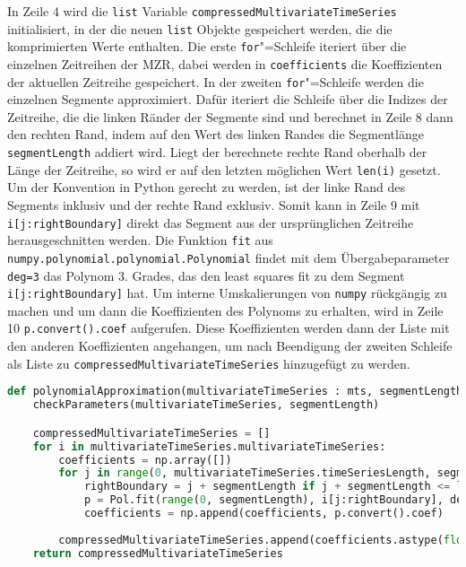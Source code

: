 In Zeile 4 wird die \lstinline|list| Variable \lstinline|compressedMultivariateTimeSeries| initialisiert, in der die neuen \lstinline|list| Objekte gespeichert werden, die die komprimierten Werte enthalten. Die erste \lstinline|for|"=Schleife iteriert über die einzelnen Zeitreihen der \ac{MZR}, dabei werden in \texttt{coeffi\allowbreak cients} die Koeffizienten der aktuellen Zeitreihe gespeichert. In der zweiten \lstinline|for|"=Schleife werden die einzelnen Segmente approximiert. Dafür iteriert die Schleife über die Indizes der Zeitreihe, die die linken Ränder der Segmente sind und berechnet in Zeile 8 dann den rechten Rand, indem auf den Wert des linken Randes die Segmentlänge \lstinline|segmentLength| addiert wird. Liegt der berechnete rechte Rand oberhalb der Länge der Zeitreihe, so wird er auf den letzten möglichen Wert \lstinline|len(i)| gesetzt. Um der Konvention in Python gerecht zu werden, ist der linke Rand des Segments inklusiv und der rechte Rand exklusiv. Somit kann in Zeile 9 mit \lstinline|i[j:rightBoundary]| direkt das Segment aus der ursprünglichen Zeitreihe herausgeschnitten werden. Die Funktion \lstinline|fit| aus \lstinline|numpy.polynomial.polynomial.Polynomial| findet mit dem Übergabeparameter \lstinline|deg=3| das Polynom 3. Grades, das den least squares fit zu dem Segment \lstinline|i[j:rightBoundary]| hat. Um interne Umskalierungen von \lstinline|numpy| rückgängig zu machen und um dann die Koeffizienten des Polynoms zu erhalten, wird in Zeile 10 \lstinline|p.convert().coef| aufgerufen. Diese Koeffizienten werden dann der Liste mit den anderen Koeffizienten angehangen, um nach Beendigung der zweiten Schleife als Liste zu \lstinline|compressedMultivariateTimeSeries| hinzugefügt zu werden.
\begin{lstlisting}[caption=Stückweise polynomielle Approximation, label=lst:stückweisepolynomielleapproximation, style=Python, language=Python]
def polynomialApproximation(multivariateTimeSeries : mts, segmentLength : int):
    checkParameters(multivariateTimeSeries, segmentLength)

    compressedMultivariateTimeSeries = []
    for i in multivariateTimeSeries.multivariateTimeSeries:
        coefficients = np.array([])
        for j in range(0, multivariateTimeSeries.timeSeriesLength, segmentLength):
            rightBoundary = j + segmentLength if j + segmentLength <= len(i) else len(i)
            p = Pol.fit(range(0, segmentLength), i[j:rightBoundary], deg=3)
            coefficients = np.append(coefficients, p.convert().coef)
        
        compressedMultivariateTimeSeries.append(coefficients.astype(float).tolist())
    return compressedMultivariateTimeSeries
\end{lstlisting}

